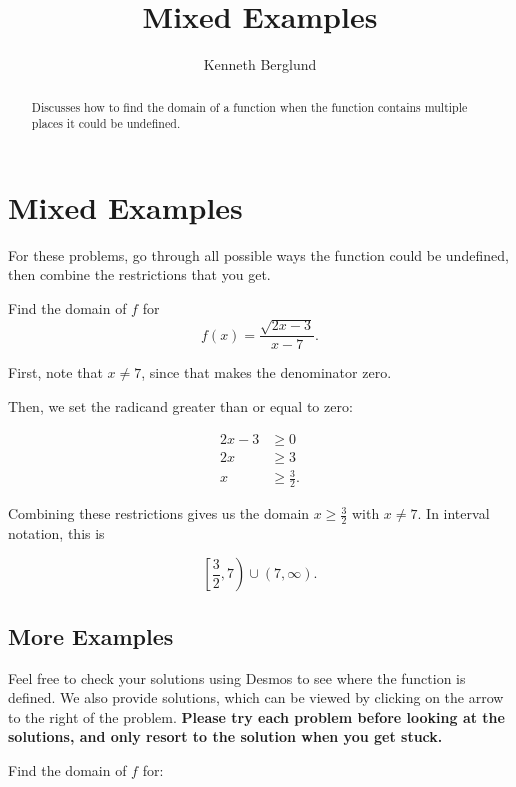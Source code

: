 \documentclass{ximera}
\title{Mixed Examples}
\author{Kenneth Berglund}
\begin{document}
\begin{abstract}
Discusses how to find the domain of  a function when the function contains multiple places it could be undefined. 
\end{abstract}
\maketitle

\section{Mixed Examples}
For these problems, go through all possible ways the function could be undefined, then combine the restrictions that you get.

\begin{example}
Find the domain of $f$ for $$f(x) = \frac{\sqrt{2x - 3}}{x - 7}.$$

\begin{explanation}
First, note that $x \ne 7$, since that makes the denominator zero.

Then, we set the radicand greater than or equal to zero:

\begin{align*}2x-3&\ge 0 \\ 2x & \ge 3 \\ x & \ge \frac{3}{2}. \end{align*}

Combining these restrictions gives us the domain $x \ge \frac{3}{2}$ with $x \ne 7$. In interval notation, this is

$$\left[\frac{3}{2}, 7\right) \cup (7, \infty).$$
\end{explanation}
\end{example}
\subsection{More Examples}
Feel free to check your solutions using Desmos to see where the function is defined. We also provide solutions, which can be viewed by clicking on the arrow to the right of the problem. \textbf{Please try each problem before looking at the solutions, and only resort to the solution when you get stuck.} 

Find the domain of $f$ for:
\end{document}
